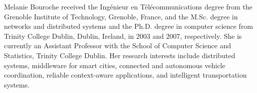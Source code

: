 \documentclass{ieeeaccess}
\begin{document}
\begin{IEEEbiographynophoto}{Melanie Bouroche}
received the Ing\'enieur en T\'el\'ecommunications degree from the Grenoble
Institute of Technology, Grenoble, France, and the M.Sc. degree in networks
and distributed systems and the Ph.D. degree in computer science from Trinity
College Dublin, Dublin, Ireland, in 2003 and 2007, respectively. She is
currently an Assistant Professor with the School of Computer Science and
Statistics, Trinity College Dublin. Her research interests include distributed
systems, middleware for smart cities, connected and autonomous vehicle
coordination, reliable context-aware applications, and intelligent
transportation systems.
\end{IEEEbiographynophoto}

\EOD
\end{document}
